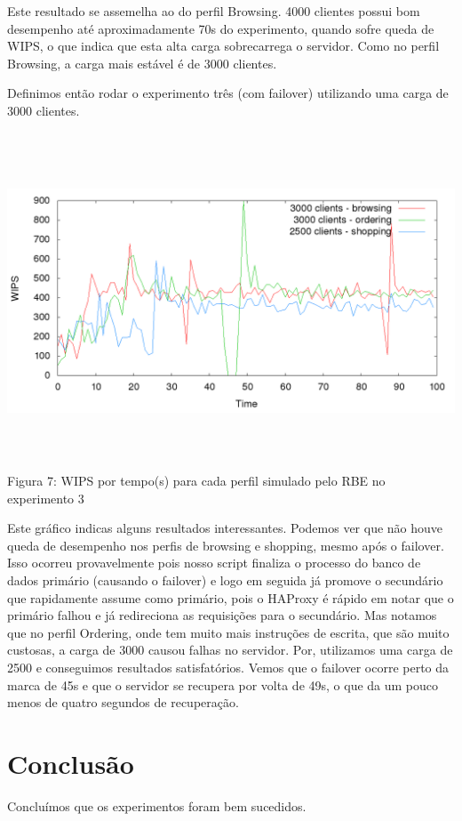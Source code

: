 \documentclass[11pt,twoside]{article}
\begin{document}
Este resultado se assemelha ao do perfil Browsing. 4000 clientes possui bom desempenho até aproximadamente 70s do experimento, quando sofre queda de WIPS, o que indica que esta alta carga sobrecarrega o servidor. Como no perfil Browsing, a carga mais estável é de 3000 clientes.

Definimos então rodar o experimento três (com failover) utilizando uma carga de 3000 clientes.

\begin{center}
\includegraphics[width=15cm, height=10cm]{images/exp3/plot_exp3}
Figura 7: WIPS por tempo(s) para cada perfil simulado pelo RBE no experimento 3
\end{center}

Este gráfico indicas alguns resultados interessantes. Podemos ver que não houve queda de desempenho nos perfis de browsing e shopping, mesmo após o failover. Isso ocorreu provavelmente pois nosso script finaliza o processo do banco de dados primário (causando o failover) e logo em seguida já promove o secundário que rapidamente assume como primário, pois o HAProxy é rápido em notar que o primário falhou e já redireciona as requisições para o secundário.
Mas notamos que no perfil Ordering, onde tem muito mais instruções de escrita, que são muito custosas, a carga de 3000 causou falhas no servidor. Por, utilizamos uma carga de 2500 e conseguimos resultados satisfatórios. Vemos que o failover ocorre perto da marca de 45s e que o servidor se recupera por volta de 49s, o que da um pouco menos de quatro segundos de recuperação.

\section{Conclus\~ao}
Concluímos que os experimentos foram bem sucedidos.
\end{document}
